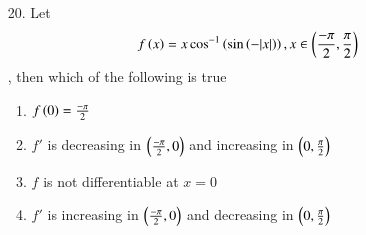 \documentclass[journal,12pt,onecolumn]{IEEEtran}
\theoremstyle{remark}
\begin{document}
\begin{enumerate}
	\item[20.] Let
		\begin{align}
			f\left(x\right) = x \cos ^{-1}\left(\sin \left(-|x|\right)\right), x \in \left(\frac{-\pi}{2}, \frac{\pi}{2}\right)
		\end{align}, then which of the following is true
		
		\hfill{}
		\begin{enumerate}
			\item $f\left(0\right) = \frac{-\pi}{2}$ 
			\item $f'$ is decreasing in $\left(\frac{-\pi}{2}, 0\right)$ and increasing in $\left(0, \frac{\pi}{2}\right)$ 
			\item $f$ is not differentiable at $x = 0$  
			\item $f'$ is increasing in $\left(\frac{-\pi}{2}, 0\right)$ and decreasing in $\left(0, \frac{\pi}{2}\right)$
		\end{enumerate}



\end{enumerate}
\end{document}
